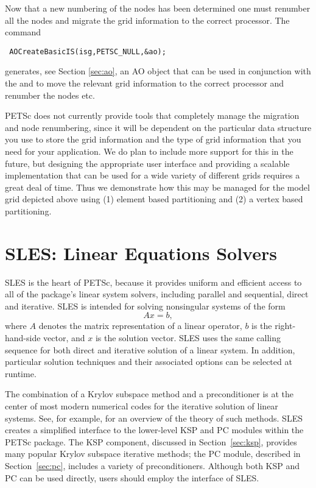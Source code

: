 Now that a new numbering of the nodes has been determined one must 
renumber all the nodes and migrate the grid information to the correct processor.
The command
\begin{verbatim}
 AOCreateBasicIS(isg,PETSC_NULL,&ao);
\end{verbatim}
generates, see Section \ref{sec:ao}, an AO object that can be used in conjunction with the
 and  to move the relevant grid information to the correct processor
and renumber the nodes etc. 

PETSc does not currently provide tools that completely manage the migration and 
node renumbering, since it will be dependent on the particular data structure you 
use to store the grid information and the type of grid information that you need
for your application. We do plan to include more support for this in the future,
but designing the appropriate user interface and providing a scalable implementation
that can be used for a wide variety of different grids requires a great deal of time.
Thus we demonstrate how this may be managed for the model
grid depicted above using (1) element based partitioning and (2) a vertex based 
partitioning. 



 


\chapter{SLES: Linear Equations Solvers} 
\label{ch:sles}

SLES is the heart of PETSc, because it provides uniform and efficient access 
to all of the package's linear system solvers, including parallel and sequential,
direct and iterative.
SLES is intended for solving nonsingular systems of the form
\begin{equation}
   A x = b,
\label{eq:Ax=b}
\end{equation}
where $ A$ denotes the matrix representation of a linear operator, $b$
is the right-hand-side vector, and $ x $ is the solution vector.  SLES
uses the same calling sequence for both direct and iterative solution
of a linear system.  In addition, particular solution techniques and
their associated options can be selected at runtime.

The combination of a Krylov subspace method and a preconditioner is at
the center of most modern numerical codes for the iterative solution of
linear systems.  See, for example, \cite{fgn} for an overview of the theory
of such methods.  SLES creates a simplified interface to the
lower-level KSP and PC modules within the PETSc package.  The KSP component, 
discussed in
Section~\ref{sec:ksp}, provides many popular Krylov
 subspace iterative methods;
the PC module, described in Section~\ref{sec:pc}, includes a
variety of preconditioners.  Although both  KSP and PC can be used
directly, users should employ the interface of SLES.

